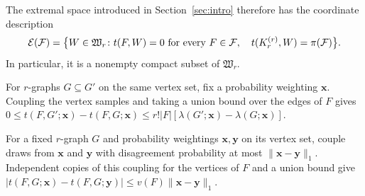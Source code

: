 \documentclass[10pt]{article}
\numberwithin{equation}{section}
\theoremstyle{definition}
\newcommand{\x}{\boldsymbol{x}}\newcommand{\y}{\boldsymbol{y}}
\begin{document}
The extremal space introduced in Section~\ref{sec:intro} therefore has the coordinate description
\[
 \mathcal E(\mathcal F)=\bigl\{W\in\mathfrak W_r\colon
 t(F,W)=0\ \text{for every }F\in\mathcal F,\quad
 t(K_r^{(r)},W)=\pi(\mathcal F)\bigr\}.
\]
In particular, it is a nonempty compact subset of $\mathfrak W_r$.

For $r$-graphs $G\subseteq G'$ on the same vertex set, fix a probability weighting $\x$. Coupling the vertex samples and taking a union bound over the edges of $F$ gives $0\le t(F,G';\x)-t(F,G;\x)\le r!|F|[\lambda(G';\x)-\lambda(G;\x)]$.

For a fixed $r$-graph $G$ and probability weightings $\x,\y$ on its vertex set, couple draws from $\x$ and $\y$ with disagreement probability at most $\|\x-\y\|_1$. Independent copies of this coupling for the vertices of $F$ and a union bound give $|t(F,G;\x)-t(F,G;\y)|\le v(F)\|\x-\y\|_1$.
\end{document}
